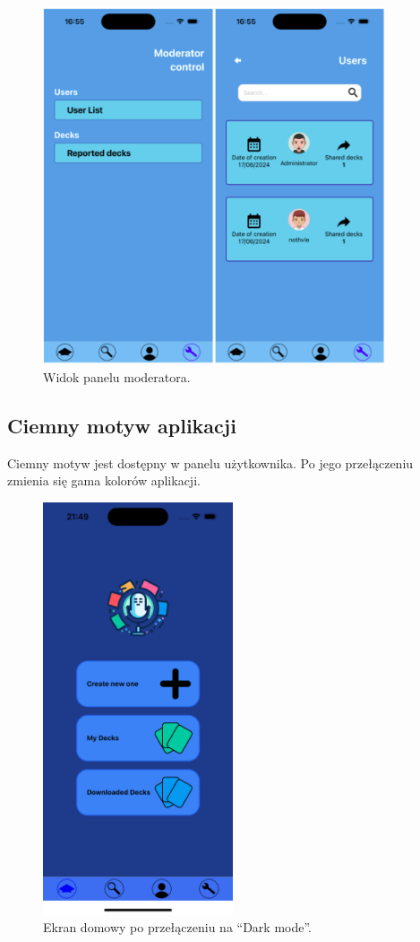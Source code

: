 \begin{figure}[H]
    \centering
    \includegraphics[width=0.9\textwidth]{chapters/chapter_10/images_mobile/moderator_panel}
    \caption{Widok panelu moderatora.}
    \label{img:moderator_panel}
\end{figure}


\subsection{Ciemny motyw aplikacji}
Ciemny motyw jest dostępny w panelu użytkownika. Po jego przełączeniu zmienia się gama kolorów aplikacji.

\begin{figure}[H]
    \centering
    \includegraphics[width=0.5\textwidth]{chapters/chapter_10/images_mobile/dark_mode}
    \caption{Ekran domowy po przełączeniu na “Dark mode”.}
    \label{img:dark_mode}
\end{figure}